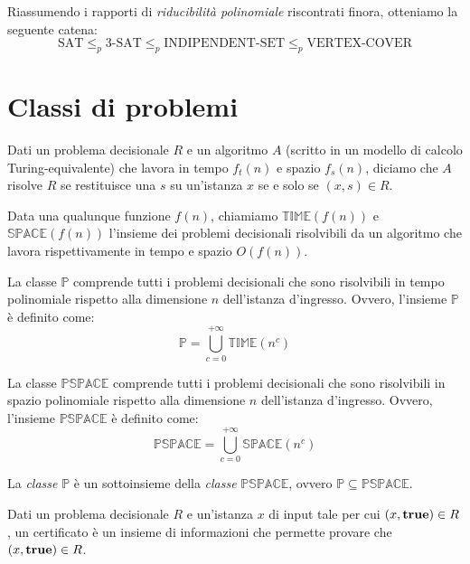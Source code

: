 \noindent
Riassumendo i rapporti di \emph{riducibilità polinomiale} riscontrati finora,
otteniamo la seguente catena:
\[\text{SAT}\leq_p\text{3-SAT}\leq_p\text{INDIPENDENT-SET}\leq_p\text{VERTEX-COVER}\]

\section{Classi di problemi}
\begin{definition}[Algoritmo]
    Dati un problema decisionale $R$ e un algoritmo $A$ (scritto in un modello
    di calcolo Turing-equivalente) che lavora in tempo $f_t(n)$ e spazio $f_s(n)$,
    diciamo che $A$ risolve $R$ se restituisce una $s$ su un'istanza $x$ se e solo
    se $(x,s)\in R$.
\end{definition}
\begin{definition}
    Data una qualunque funzione $f(n)$, chiamiamo $\mathbb{TIME}(f(n))$ e
    $\mathbb{SPACE}(f(n))$ l'insieme dei problemi decisionali risolvibili da un
    algoritmo che lavora rispettivamente in tempo e spazio $O(f(n))$.
\end{definition}
\begin{definition}
    La classe $\mathbb{P}$ comprende tutti i problemi decisionali che sono
    risolvibili in tempo polinomiale rispetto alla dimensione $n$ dell'istanza
    d'ingresso. Ovvero, l'insieme $\mathbb{P}$ è definito come:
    \[\mathbb{P}=\bigcup_{c=0}^{+\infty}\mathbb{TIME}(n^c)\]
\end{definition}
\begin{definition}
    La classe $\mathbb{PSPACE}$ comprende tutti i problemi decisionali che sono
    risolvibili in spazio polinomiale rispetto alla dimensione $n$ dell'istanza
    d'ingresso. Ovvero, l'insieme $\mathbb{PSPACE}$ è definito come:
    \[\mathbb{PSPACE}=\bigcup_{c=0}^{+\infty}\mathbb{SPACE}(n^c)\]
\end{definition}
\begin{note}
    La \emph{classe} $\mathbb{P}$ è un sottoinsieme della \emph{classe}
    $\mathbb{PSPACE}$, ovvero $\mathbb{P}\subseteq\mathbb{PSPACE}$.
\end{note}

\begin{definition}[Certificato]
    Dati un problema decisionale $R$ e un'istanza $x$ di input tale per cui
    $(x,{\bf true})\in R$, un certificato è un insieme di informazioni che
    permette provare che $(x,{\bf true})\in R$.
\end{definition}

